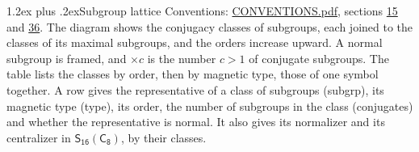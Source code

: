 \documentclass[10pt,a4paper]{article}
\makeatletter
\renewcommand\section{\@startsection{section}{1}{\z@}{-3ex plus -1ex minus -.2ex}%
  {1.2ex plus .2ex}{\normalfont\large\sffamily\bfseries\color{parttitle}}}
\numberwithin{equation}{section}
\newcommand{\grp}[1]{\mathsf{#1}}
\makeatother
\begin{document}
\section{Subgroup lattice}\label{s:subgroups}
Conventions: \href{../../CONVENTIONS.pdf}{CONVENTIONS.pdf}, sections \href{../../../rotation/CONVENTIONS.pdf\#conv.15}{15} and \href{../../CONVENTIONS.pdf\#conv.36}{36}.
The diagram shows the conjugacy classes of subgroups, each joined to the classes of its maximal subgroups, and the orders increase upward. \label{n:index.conjugates.c}A normal subgroup is framed, and ${\times}c$ is the number $c > 1$ of conjugate subgroups. The table lists the classes by order, then by magnetic type, those of one symbol together. \label{n:head.subgroup}\label{n:head.magnetic.type}\label{n:head.order}\label{n:head.conjugates}\label{n:head.normal}A row gives the representative of a class of subgroups (subgrp), its magnetic type (type), its order, the number of subgroups in the class (conjugates) and whether the representative is normal. \label{n:head.normalizer}\label{n:head.centralizer}It also gives its normalizer and its centralizer in $\grp{S_{16}}(\grp{C_{8}})$, by their classes. 
\begin{center}
\end{center}
\end{document}
